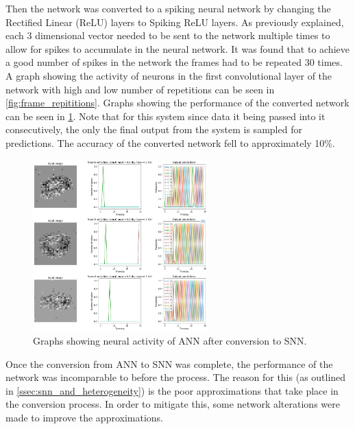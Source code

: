 Then the network was converted to a spiking neural network by changing the Rectified Linear (ReLU) layers to Spiking ReLU layers. As previously explained, each 3 dimensional vector needed to be sent to the network multiple times to allow for spikes to accumulate in the neural network. It was found that to achieve a good number of spikes in the network the frames had to be repeated 30 times. A graph showing the activity of neurons in the first convolutional layer of the network with high and low number of repetitions can be seen in \cref{fig:frame_repititions}. Graphs showing the performance of the converted network can be seen in \cref{fig:post_snn_conversion}. Note that for this system since data it being passed into it consecutively, the only the final output from the system is sampled for predictions. The accuracy of the converted network fell to approximately 10\%.

\begin{figure}[htb]%
    \centering
    \includegraphics[width=0.6\textwidth]{implementation/images/post_snn_conversion.png}
    \caption{Graphs showing neural activity of ANN after conversion to SNN.}%
    \label{fig:post_snn_conversion}%
\end{figure}

Once the conversion from ANN to SNN was complete, the performance of the network was incomparable to before the process. The reason for this (as outlined in \cref{ssec:snn_and_heterogeneity}) is the poor approximations that take place in the conversion process. In order to mitigate this, some network alterations were made to improve the approximations.

